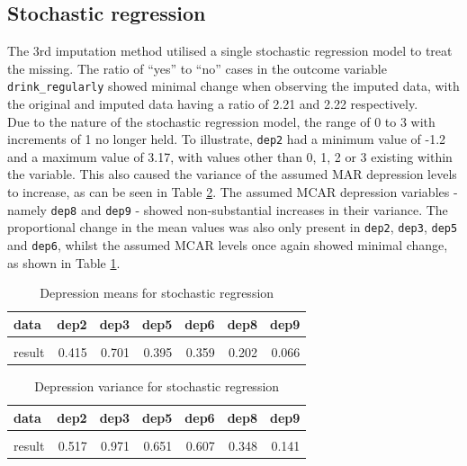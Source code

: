 \documentclass[
]{article}
\begin{document}
\hypertarget{stochastic-regression}{%
\subsection{Stochastic regression}\label{stochastic-regression}}

The 3rd imputation method utilised a single stochastic regression model to treat the missing. The ratio of ``yes'' to ``no'' cases in the outcome variable \texttt{drink\_regularly} showed minimal change when observing the imputed data, with the original and imputed data having a ratio of 2.21 and 2.22 respectively.\\
Due to the nature of the stochastic regression model, the range of 0 to 3 with increments of 1 no longer held. To illustrate, \texttt{dep2} had a minimum value of -1.2 and a maximum value of 3.17, with values other than 0, 1, 2 or 3 existing within the variable. This also caused the variance of the assumed MAR depression levels to increase, as can be seen in Table \ref{tab:dep-vars-si}. The assumed MCAR depression variables - namely \texttt{dep8} and \texttt{dep9} - showed non-substantial increases in their variance. The proportional change in the mean values was also only present in \texttt{dep2}, \texttt{dep3}, \texttt{dep5} and \texttt{dep6}, whilst the assumed MCAR levels once again showed minimal change, as shown in Table \ref{tab:dep-means-si}.

\begin{table}[!h]

\caption{\label{tab:dep-means-si}Depression means for stochastic regression}
\centering
\begin{tabular}[t]{lrrrrrr}
\toprule
data & dep2 & dep3 & dep5 & dep6 & dep8 & dep9\\
\midrule
\cellcolor{gray!6}{original} & \cellcolor{gray!6}{0.282} & \cellcolor{gray!6}{0.533} & \cellcolor{gray!6}{0.310} & \cellcolor{gray!6}{0.201} & \cellcolor{gray!6}{0.203} & \cellcolor{gray!6}{0.067}\\
result & 0.415 & 0.701 & 0.395 & 0.359 & 0.202 & 0.066\\
\bottomrule
\end{tabular}
\end{table}

\begin{table}[!h]

\caption{\label{tab:dep-vars-si}Depression variance for stochastic regression}
\centering
\begin{tabular}[t]{lrrrrrr}
\toprule
data & dep2 & dep3 & dep5 & dep6 & dep8 & dep9\\
\midrule
\cellcolor{gray!6}{original} & \cellcolor{gray!6}{0.340} & \cellcolor{gray!6}{0.733} & \cellcolor{gray!6}{0.494} & \cellcolor{gray!6}{0.318} & \cellcolor{gray!6}{0.344} & \cellcolor{gray!6}{0.138}\\
result & 0.517 & 0.971 & 0.651 & 0.607 & 0.348 & 0.141\\
\bottomrule
\end{tabular}
\end{table}
\end{document}
